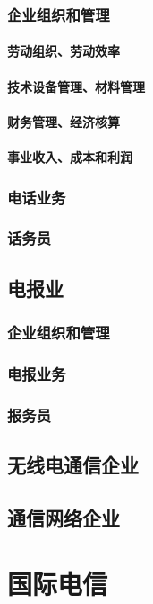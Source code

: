 \documentclass[UTF8]{../../RepresentationUniverse}
\begin{document}
        \subsubsection{企业组织和管理}
            \paragraph{劳动组织、劳动效率}
            \paragraph{技术设备管理、材料管理}
            \paragraph{财务管理、经济核算}
            \paragraph{事业收入、成本和利润}
        \subsubsection{电话业务}
        \subsubsection{话务员}
    \subsection{电报业}
        \subsubsection{企业组织和管理}
        \subsubsection{电报业务}
        \subsubsection{报务员}
    \subsection{无线电通信企业}
    \subsection{通信网络企业}
\section{国际电信}
\end{document}
